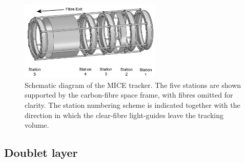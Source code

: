 \begin{figure}
  \includegraphics[width=0.6\textwidth]{detectors/tracker/02-Definitions/Figures/StnNum.pdf}
  \caption{Schematic diagram of the MICE tracker. The five stations are shown supported by the carbon-fibre space frame, with fibres omitted for clarity. The station numbering scheme is indicated together with the direction in which the clear-fibre light-guides leave the tracking volume.}
  \label{Fig:StnNum}
\end{figure}

\subsection{Doublet layer}
\label{SubSect:SciFiDblLyr}

